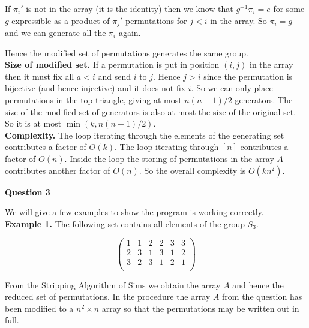 \documentclass[12pt]{extarticle}
\begin{document}
If $\pi_i'$ is not in the array (it is the identity) then we know that $g^{-1}\pi_i = e$ for some $g$ expressible as a product of $\pi_j'$  permutations for $j<i$ in the array. So $\pi_i = g$ and we can generate all the $\pi_i$ again. 

Hence the modified set of permutations generates the same group.\\

\textbf{Size of modified set.} If a permutation is put in position $(i,j)$ in the array then it must fix all $a<i$ and send $i$ to $j$. Hence $j>i$ since the permutation is bijective (and hence injective) and it does not fix $i$. So we can only place permutations in the top triangle, giving at most $n(n-1)/2$ generators. The size of the modified set of generators is also at most the size of the original set. So it is at most $\min (k,n(n-1)/2)$.\\

\textbf{Complexity.} The loop iterating through the elements of the generating set contributes a factor of $O(k)$. The loop iterating through $[n]$ contributes a factor of $O(n)$. Inside the loop the storing of permutations in the array $A$ contributes another factor of $O(n)$. So the overall complexity is $O(kn^2)$.

\begin{center}
\textbf{Question 3}
\end{center}

We will give a few examples to show the program is working correctly.\\

\textbf{Example 1.} The following set contains all elements of the group $S_3$. 

$$\begin{pmatrix} 
  1 &  1 &  2 &  2 &  3 &  3 \\ 
  2 &  3 &  1 &  3 &  1 &  2 \\ 
  3 &  2 &  3 &  1 &  2 &  1 \\ 
\end{pmatrix} $$


From the Stripping Algorithm of Sims we obtain the array $A$ and hence the reduced set of permutations. In the procedure the array $A$ from the question has been modified to a $n^2 \times n$ array so that the permutations may be written out in full. 
\end{document}
